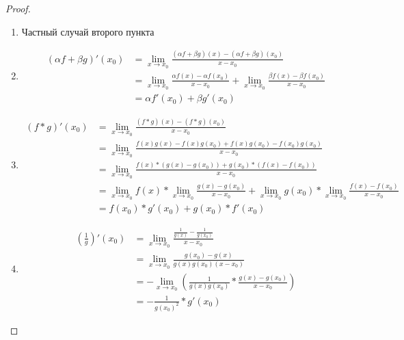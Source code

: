 \begin{proof} \quad \\
    \begin{enumerate} 
        \item Частный случай второго пункта
        \item 
        \begin{equation*}
            \begin{split}
                (\alpha f + \beta g)'(x_0) &= \lim_{x \to x_0} \frac{(\alpha f + \beta g)(x) -  (\alpha f + \beta g)(x_0)}{x - x_0} \\
                &= \lim_{x \to x_0} \frac{\alpha f(x) - \alpha f(x_0)}{x - x_0} + \lim_{x \to x_0} \frac{\beta f(x) - \beta f(x_0)}{x - x_0} \\
                &= \alpha f'(x_0) + \beta g'(x_0)
            \end{split}        
        \end{equation*}
        \item 
        \begin{equation*}
            \begin{split}
                (f * g)'(x_0) &= \lim_{x \to x_0} \frac{(f * g)(x) - (f * g)(x_0)}{x - x_0} \\
                &= \lim_{x \to x_0} \frac{f(x)g(x) - f(x)g(x_0) + f(x)g(x_0) - f(x_0)g(x_0)}{x - x_0} \\
                &= \lim_{x \to x_0} \frac{f(x) * (g(x) - g(x_0)) + g(x_0) * (f(x) - f(x_0))}{x - x_0} \\
                &= \lim_{x \to x_0} f(x) * \lim_{x \to x_0} \frac{g(x) - g(x_0)}{x - x_0} + \lim_{x \to x_0} g(x_0) * \lim_{x \to x_0} \frac{f(x) - f(x_0)}{x - x_0} \\
                &= f(x_0) * g'(x_0) + g(x_0) * f'(x_0)  
            \end{split}
        \end{equation*}
        \item 
        \begin{equation*}
            \begin{split}
               (\frac{1}{g})'(x_0) &= \lim_{x \to x_0} \frac{\frac{1}{g(x)} - \frac{1}{g(x_0)}}{x - x_0} \\
               &= \lim_{x \to x_0} \frac{g(x_0) - g(x)}{g(x)g(x_0)(x - x_0)} \\
               &= -\lim_{x \to x_0} (\frac{1}{g(x)g(x_0)} * \frac{g(x) - g(x_0)}{x - x_0}) \\
               &= - \frac{1}{g(x_0)^2} * g'(x_0) 

\end{split}
\end{equation*}
\end{enumerate}
\end{proof}
